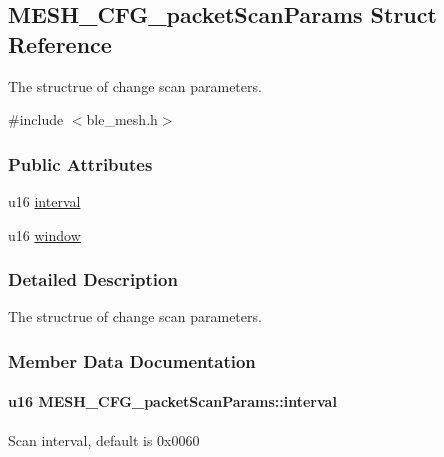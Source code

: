 \hypertarget{struct_m_e_s_h___c_f_g__packet_scan_params}{}\subsection{M\+E\+S\+H\+\_\+\+C\+F\+G\+\_\+packet\+Scan\+Params Struct Reference}
\label{struct_m_e_s_h___c_f_g__packet_scan_params}


The structrue of change scan parameters.  




{\ttfamily \#include $<$ble\+\_\+mesh.\+h$>$}

\subsubsection*{Public Attributes}
\begin{DoxyCompactItemize}
\item 
u16 \hyperlink{struct_m_e_s_h___c_f_g__packet_scan_params_ac2675c6494dad836a662c46fbb120518}{interval}
\item 
u16 \hyperlink{struct_m_e_s_h___c_f_g__packet_scan_params_a5691497117de2ca5b01e0e4ccb257f95}{window}
\end{DoxyCompactItemize}


\subsubsection{Detailed Description}
The structrue of change scan parameters. 

\subsubsection{Member Data Documentation}
\paragraph[{\texorpdfstring{interval}{interval}}]{\setlength{\rightskip}{0pt plus 5cm}u16 M\+E\+S\+H\+\_\+\+C\+F\+G\+\_\+packet\+Scan\+Params\+::interval}\hypertarget{struct_m_e_s_h___c_f_g__packet_scan_params_ac2675c6494dad836a662c46fbb120518}{}\label{struct_m_e_s_h___c_f_g__packet_scan_params_ac2675c6494dad836a662c46fbb120518}
Scan interval, default is 0x0060 
